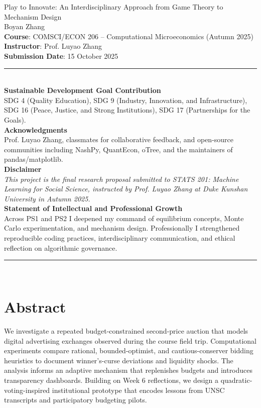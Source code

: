\documentclass[11pt]{article}
\begin{document}
\hypersetup{pageanchor=false}
\begin{titlepage}
  \centering
  {\LARGE Play to Innovate: An Interdisciplinary Approach from Game Theory to Mechanism Design\\[1.5ex]}
  {\large Boyan Zhang\\}
  \vspace{1.5em}
  \textbf{Course}: COMSCI/ECON 206 -- Computational Microeconomics (Autumn 2025)\\
  \textbf{Instructor}: Prof. Luyao Zhang\\
  \textbf{Submission Date}: 15 October 2025\\[1.5ex]
  \rule{\linewidth}{0.4pt}\\[1ex]
  \textbf{Sustainable Development Goal Contribution}\\[0.5ex]
  SDG 4 (Quality Education), SDG 9 (Industry, Innovation, and Infrastructure), SDG 16 (Peace, Justice, and Strong Institutions), SDG 17 (Partnerships for the Goals).\\[1ex]
  \textbf{Acknowledgments}\\[0.5ex]
  Prof. Luyao Zhang, classmates for collaborative feedback, and open-source communities including NashPy, QuantEcon, oTree, and the maintainers of pandas/matplotlib.\\[1ex]
  \textbf{Disclaimer}\\[0.5ex]
  \emph{This project is the final research proposal submitted to STATS 201: Machine Learning for Social Science, instructed by Prof. Luyao Zhang at Duke Kunshan University in Autumn 2025.}\\[1ex]
  \textbf{Statement of Intellectual and Professional Growth}\\[0.5ex]
  Across PS1 and PS2 I deepened my command of equilibrium concepts, Monte Carlo experimentation, and mechanism design. Professionally I strengthened reproducible coding practices, interdisciplinary communication, and ethical reflection on algorithmic governance.\\[2ex]
  \rule{\linewidth}{0.4pt}\\[2ex]
\end{titlepage}

\tableofcontents
\clearpage
\hypersetup{pageanchor=true}
\setcounter{page}{1}

\section{Abstract}
We investigate a repeated budget-constrained second-price auction that models digital advertising exchanges observed during the course field trip. Computational experiments compare rational, bounded-optimist, and cautious-conserver bidding heuristics to document winner's-curse deviations and liquidity shocks. The analysis informs an adaptive mechanism that replenishes budgets and introduces transparency dashboards. Building on Week 6 reflections, we design a quadratic-voting-inspired institutional prototype that encodes lessons from UNSC transcripts and participatory budgeting pilots.
\end{document}
